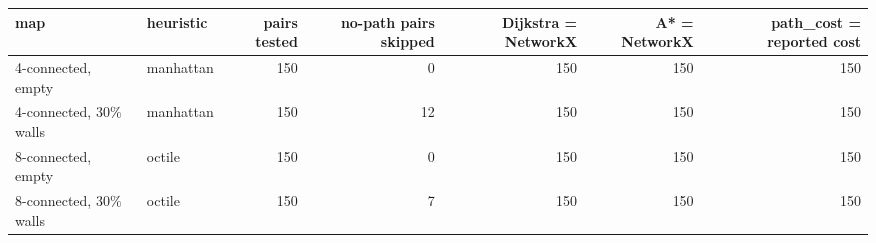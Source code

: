 \begin{tabular}{llrrrrr}
\toprule
map & heuristic & pairs tested & no-path pairs skipped & Dijkstra = NetworkX & A* = NetworkX & path\_cost = reported cost \\
\midrule
4-connected, empty & manhattan & 150 & 0 & 150 & 150 & 150 \\
4-connected, 30\% walls & manhattan & 150 & 12 & 150 & 150 & 150 \\
8-connected, empty & octile & 150 & 0 & 150 & 150 & 150 \\
8-connected, 30\% walls & octile & 150 & 7 & 150 & 150 & 150 \\
\bottomrule
\end{tabular}
